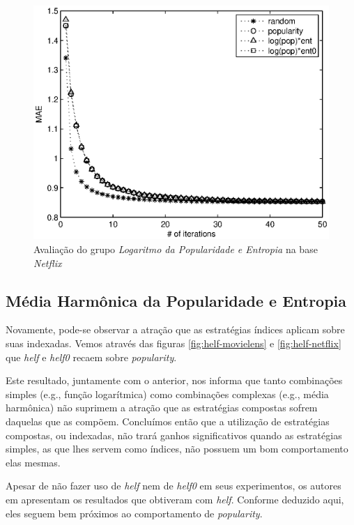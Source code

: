 \begin{figure}[ht]
\centering
\includegraphics{nf_logpopent_logpopent0.eps}
\caption{Avaliação do grupo \textit{Logaritmo da Popularidade e Entropia} na base \textit{Netflix}}
\label{fig:logpop-entropia-netflix}
\end{figure}

\subsection{Média Harmônica da Popularidade e Entropia}

Novamente, pode-se observar a atração que as estratégias índices aplicam sobre suas indexadas. Vemos através das figuras \ref{fig:helf-movielens} e \ref{fig:helf-netflix} que \textit{helf} e \textit{helf0} recaem sobre \textit{popularity}. 

Este resultado, juntamente com o anterior, nos informa que tanto combinações simples (e.g., função logarítmica) como combinações complexas (e.g., média harmônica) não suprimem a atração que as estratégias compostas sofrem daquelas que as compõem. Concluímos então que a utilização de estratégias compostas, ou indexadas, não trará ganhos significativos quando as estratégias simples, as que lhes servem como índices, não possuem um bom comportamento elas mesmas.

Apesar de \citep{Elahi:2014:ALS:2542182.2542195} não fazer uso de \textit{helf} nem de \textit{helf0} em seus experimentos, os autores em \citep{Rashid:2008:LPN:1540276.1540302} apresentam os resultados que obtiveram com \textit{helf}. Conforme deduzido aqui, eles seguem bem próximos ao comportamento de \textit{popularity}. 

